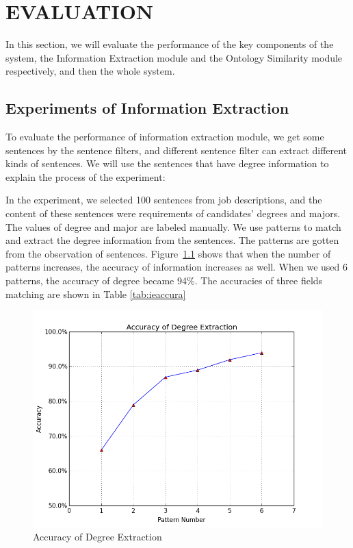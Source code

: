 \chapter{EVALUATION}

In this section, we will evaluate the performance of the key components of the system, the Information Extraction module and the Ontology Similarity module respectively, and then the whole system.

\section{Experiments of Information Extraction }

To evaluate the performance of information extraction module, we get some sentences by the sentence filters, and different sentence filter can extract different kinds of sentences. We will use the sentences that have degree information to explain the process of the experiment:

In the experiment, we selected 100 sentences from job descriptions, and the content of these sentences were requirements of candidates' degrees and majors. The values of degree and major are labeled manually. We use patterns to  match and extract the degree information from the sentences. The patterns are gotten from the observation of sentences. Figure~\ref{fig:degree_accuracy} shows that when the number of  patterns increases, the accuracy of information increases as well. When we used 6 patterns, the accuracy of degree became 94\%. The accuracies of three fields matching are shown in Table \ref{tab:ieaccura}

\begin{figure}[htbp]
  \centering
  \includegraphics[scale=0.5]{images/degree_accuracy.png}
  \caption{Accuracy of Degree Extraction  }
  \label{fig:degree_accuracy}
\end{figure}


